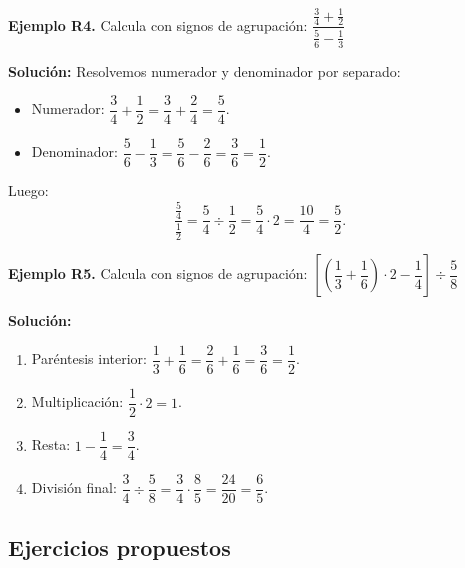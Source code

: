 \documentclass[12pt, letterpaper]{article}
\begin{document}
\textbf{Ejemplo R4.} Calcula con signos de agrupación: $\dfrac{\frac{3}{4} + \frac{1}{2}}{\frac{5}{6} - \frac{1}{3}}$

\begin{cuadrosolucion}
  \textbf{Solución:} Resolvemos numerador y denominador por separado:
  \begin{itemize}
    \item Numerador: $\dfrac{3}{4} + \dfrac{1}{2} = \dfrac{3}{4} + \dfrac{2}{4} = \dfrac{5}{4}$.
    \item Denominador: $\dfrac{5}{6} - \dfrac{1}{3} = \dfrac{5}{6} - \dfrac{2}{6} = \dfrac{3}{6} = \dfrac{1}{2}$.
  \end{itemize}
  Luego:
  $$\frac{\frac{5}{4}}{\frac{1}{2}} = \frac{5}{4} \div \frac{1}{2} = \frac{5}{4} \cdot 2 = \frac{10}{4} = \frac{5}{2}.$$
\end{cuadrosolucion}

\textbf{Ejemplo R5.} Calcula con signos de agrupación: $\left[\left(\dfrac{1}{3} + \dfrac{1}{6}\right) \cdot 2 - \dfrac{1}{4}\right] \div \dfrac{5}{8}$

\begin{cuadrosolucion}
  \textbf{Solución:}
  \begin{enumerate}
    \item Paréntesis interior: $\dfrac{1}{3} + \dfrac{1}{6} = \dfrac{2}{6} + \dfrac{1}{6} = \dfrac{3}{6} = \dfrac{1}{2}$.
    \item Multiplicación: $\dfrac{1}{2} \cdot 2 = 1$.
    \item Resta: $1 - \dfrac{1}{4} = \dfrac{3}{4}$.
    \item División final: $\dfrac{3}{4} \div \dfrac{5}{8} = \dfrac{3}{4} \cdot \dfrac{8}{5} = \dfrac{24}{20} = \dfrac{6}{5}$.
  \end{enumerate}
\end{cuadrosolucion}

\subsection{Ejercicios propuestos}
\end{document}
